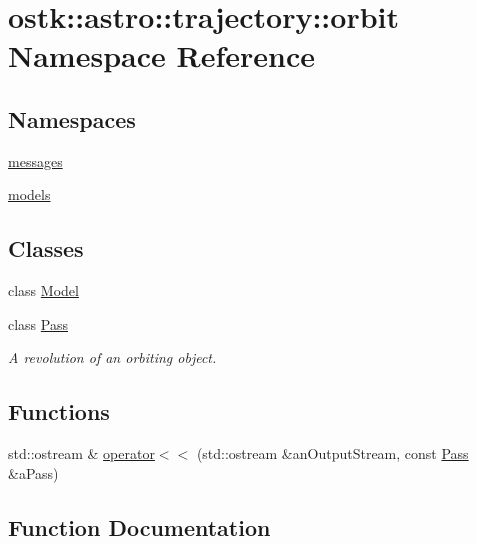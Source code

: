 \hypertarget{namespaceostk_1_1astro_1_1trajectory_1_1orbit}{}\section{ostk\+:\+:astro\+:\+:trajectory\+:\+:orbit Namespace Reference}
\label{namespaceostk_1_1astro_1_1trajectory_1_1orbit}
\subsection*{Namespaces}
\begin{DoxyCompactItemize}
\item 
 \hyperlink{namespaceostk_1_1astro_1_1trajectory_1_1orbit_1_1messages}{messages}
\item 
 \hyperlink{namespaceostk_1_1astro_1_1trajectory_1_1orbit_1_1models}{models}
\end{DoxyCompactItemize}
\subsection*{Classes}
\begin{DoxyCompactItemize}
\item 
class \hyperlink{classostk_1_1astro_1_1trajectory_1_1orbit_1_1_model}{Model}
\item 
class \hyperlink{classostk_1_1astro_1_1trajectory_1_1orbit_1_1_pass}{Pass}
\begin{DoxyCompactList}\small\item\em A revolution of an orbiting object. \end{DoxyCompactList}\end{DoxyCompactItemize}
\subsection*{Functions}
\begin{DoxyCompactItemize}
\item 
std\+::ostream \& \hyperlink{namespaceostk_1_1astro_1_1trajectory_1_1orbit_a09a00f0d051ce7936c28484c812f350d}{operator$<$$<$} (std\+::ostream \&an\+Output\+Stream, const \hyperlink{classostk_1_1astro_1_1trajectory_1_1orbit_1_1_pass}{Pass} \&a\+Pass)
\end{DoxyCompactItemize}


\subsection{Function Documentation}
\mbox{\label{namespaceostk_1_1astro_1_1trajectory_1_1orbit_a09a00f0d051ce7936c28484c812f350d}} 
